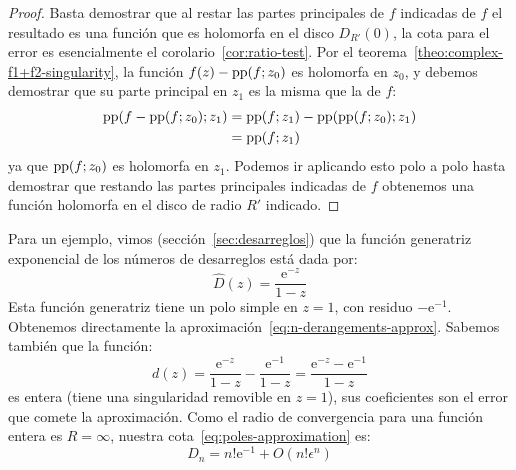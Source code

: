   \begin{proof}
    Basta demostrar que
    al restar las partes principales de \(f\) indicadas
    de \(f\) el resultado
    es una función que es holomorfa en el disco
    \(D_{R'}(0)\),
    la cota para el error
    es esencialmente el corolario~\ref{cor:ratio-test}.
    Por el teorema~\ref{theo:complex-f1+f2-singularity},
    la función \(f(z) - \operatorname{pp}(f; z_0)\) es holomorfa en \(z_0\),
    y debemos demostrar que su parte principal en \(z_1\)
    es la misma que la de \(f\):
    \begin{align*}
      \operatorname{pp}(f - \operatorname{pp}(f; z_0); z_1)
	&= \operatorname{pp}(f; z_1) - \operatorname{pp}(\operatorname{pp}(f; z_0); z_1) \\
	&= \operatorname{pp}(f; z_1)
    \end{align*}
    ya que \(\operatorname{pp}(f; z_0)\) es holomorfa en \(z_1\).
    Podemos ir aplicando esto polo a polo
    hasta demostrar
    que restando las partes principales indicadas de \(f\)
    obtenemos una función holomorfa
    en el disco de radio \(R'\) indicado.
  \end{proof}

  Para un ejemplo,
  vimos
  (sección~\ref{sec:desarreglos})
  que la función generatriz exponencial
  de los números de desarreglos está dada por:%
  \begin{equation}
    \label{eq:ae:egf-derangements}
    \widehat{D}(z)
      = \frac{\mathrm{e}^{-z}}{1 - z}
  \end{equation}
  Esta función generatriz tiene un polo simple en \(z = 1\),
  con residuo \(- \mathrm{e}^{-1}\).
  Obtenemos directamente
  la aproximación~\eqref{eq:n-derangements-approx}.
  Sabemos también que la función:
  \begin{equation}
    \label{eq:ae:derangements-error}
    d(z)
      = \frac{\mathrm{e}^{-z}}{1 - z}
	  - \frac{\mathrm{e}^{-1}}{1 - z}
      = \frac{\mathrm{e}^{-z} - \mathrm{e}^{-1}}{1 - z}
  \end{equation}
  es entera
  (tiene una singularidad removible en \(z = 1\)),
  sus coeficientes son el error que comete la aproximación.
  Como el radio de convergencia
  para una función entera es \(R = \infty\),
  nuestra cota~\eqref{eq:poles-approximation} es:
  \begin{equation}
    \label{eq:ae:derangements-approximation}
    D_n
      = n! \mathrm{e}^{-1} + O(n! \epsilon^n)
  \end{equation}

